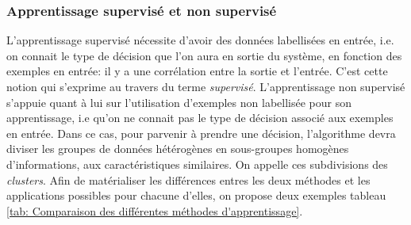 \subsubsection{Apprentissage supervisé et non supervisé} 
\label{Le Machine Learning: Généralités sur le Machine Learning: Le modèle: apprentissage supervisé et non supervisé}
L'apprentissage supervisé nécessite d'avoir des données labellisées en entrée, i.e. on connait le type de décision que l'on aura en sortie du système, en fonction des exemples en entrée: il y a une corrélation entre la sortie et l'entrée. C'est cette notion qui s'exprime au travers du terme \emph{supervisé}. 
L'apprentissage non supervisé s'appuie quant à lui sur l'utilisation d'exemples non labellisée pour son apprentissage, i.e qu'on ne connait pas le type de décision associé aux exemples en entrée. Dans ce cas, pour parvenir à prendre une décision, l'algorithme devra diviser les groupes de données hétérogènes en sous-groupes homogènes d'informations, aux caractéristiques similaires. On appelle ces subdivisions des \emph{clusters}.
Afin de matérialiser les différences entres les deux méthodes et les applications possibles pour chacune d'elles, on propose deux exemples tableau \ref {tab: Comparaison des différentes méthodes d'apprentissage}.

